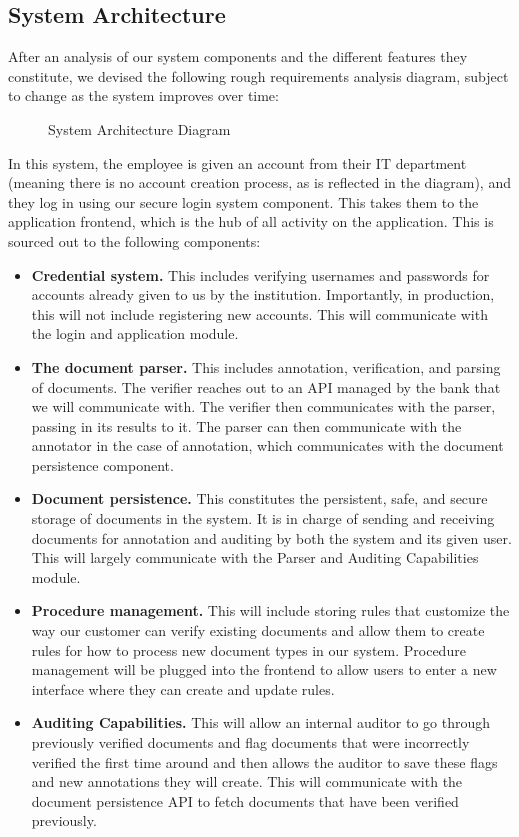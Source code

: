 \subsection{System Architecture}

After an analysis of our system components and the different features they constitute, we devised the following rough requirements analysis diagram, subject to change as the system improves over time:

\begin{figure}[H]
    \centering
    
    \caption{System Architecture Diagram}
    \label{fig:system_architecture_diagram}
\end{figure}

In this system, the employee is given an account from their IT department (meaning there is no account creation process, as is reflected in the diagram), and they log in using our secure login system component.  This takes them to the application frontend, which is the hub of all activity on the application. This is sourced out to the following components:

\begin{itemize}[wide, labelindent=0pt]
    \item \textbf{Credential system.} This includes verifying usernames and passwords for accounts already given to us by the institution. Importantly, in production, this will not include registering new accounts. This will communicate with the login and application module.
    \item \textbf{The document parser.} This includes annotation, verification, and parsing of documents. The verifier reaches out to an API managed by the bank that we will communicate with. The verifier then communicates with the parser, passing in its results to it. The parser can then communicate with the annotator in the case of annotation, which communicates with the document persistence component.
    \item \textbf{Document persistence.} This constitutes the persistent, safe, and secure storage of documents in the system. It is in charge of sending and receiving documents for annotation and auditing by both the system and its given user. This will largely communicate with the Parser and Auditing Capabilities module.
    \item \textbf{Procedure management.} This will include storing rules that customize the way our customer can verify existing documents and allow them to create rules for how to process new document types in our system. Procedure management will be plugged into the frontend to allow users to enter a new interface where they can create and update rules.
    \item \textbf{Auditing Capabilities.} This will allow an internal auditor to go through previously verified documents and flag documents that were incorrectly verified the first time around and then allows the auditor to save these flags and new annotations they will create. This will communicate with the document persistence API to fetch documents that have been verified previously.
\end{itemize}